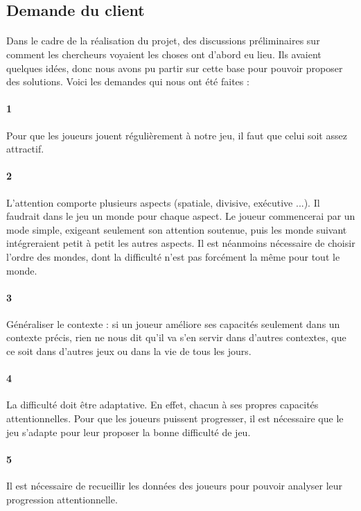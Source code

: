 \subsection{Demande du client}

\paragraph{}Dans le cadre de la réalisation du projet, des discussions préliminaires sur comment les chercheurs voyaient les choses ont d'abord eu lieu. Ils avaient quelques idées,
donc nous avons pu partir sur cette base pour pouvoir proposer des solutions. Voici les demandes qui nous ont été faites :

\paragraph{1}Pour que les joueurs jouent régulièrement à notre jeu, il faut que celui soit assez attractif.
\paragraph{2}L'attention comporte plusieurs aspects (spatiale, divisive, exécutive ...). Il faudrait dans le jeu un monde pour chaque aspect. Le joueur commencerai par un mode simple,
exigeant seulement son attention soutenue, puis les monde suivant intégreraient petit à petit les autres aspects. Il est néanmoins nécessaire de choisir l'ordre des mondes, dont la
difficulté n'est pas forcément la même pour tout le monde.
\paragraph{3}Généraliser le contexte : si un joueur améliore ses capacités seulement dans un contexte précis, rien ne nous dit qu'il va s'en servir dans d'autres contextes, que ce soit
dans d'autres jeux ou dans la vie de tous les jours.
\paragraph{4}La difficulté doit être adaptative. En effet, chacun à ses propres capacités attentionnelles. Pour que les joueurs puissent progresser, il est nécessaire que le jeu s'adapte pour
leur proposer la bonne difficulté de jeu.
\paragraph{5}Il est nécessaire de recueillir les données des joueurs pour pouvoir analyser leur progression attentionnelle.
